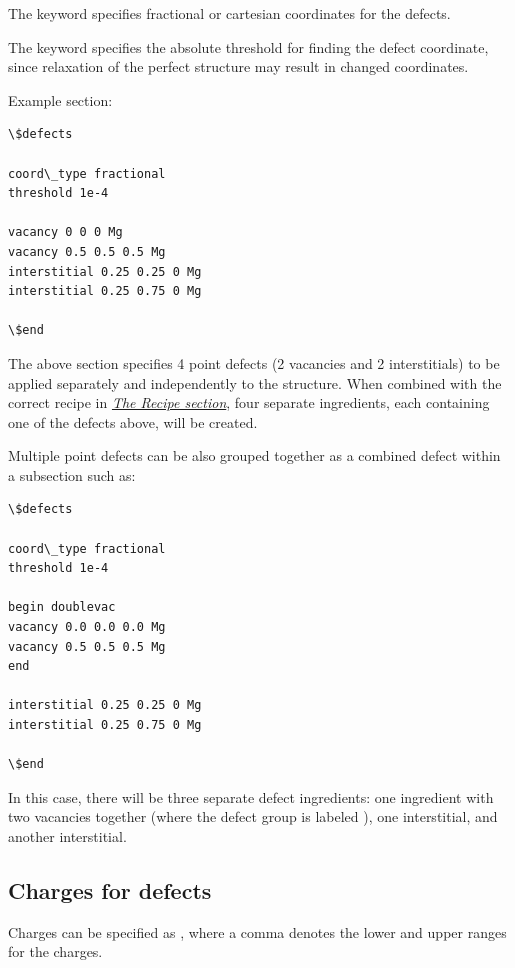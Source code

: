 \documentclass[letterpaper,10pt,english]{sphinxmanual}
\begin{document}
The  keyword specifies fractional or cartesian coordinates for the defects.

The  keyword specifies the absolute threshold for finding the defect coordinate, since relaxation of the perfect structure may result in changed coordinates.

Example  section:

\begin{Verbatim}[commandchars=\\\{\}]
\$defects

coord\_type fractional
threshold 1e-4

vacancy 0 0 0 Mg
vacancy 0.5 0.5 0.5 Mg
interstitial 0.25 0.25 0 Mg
interstitial 0.25 0.75 0 Mg

\$end
\end{Verbatim}

The above section specifies 4 point defects (2 vacancies and 2 interstitials) to be applied separately and independently to the structure. When combined with the correct recipe in {\hyperref[3_1_3_recipe::doc]{\emph{The Recipe section}}}, four separate ingredients, each containing one of the defects above, will be created.

Multiple point defects can be also grouped together as a combined defect within a  subsection such as:

\begin{Verbatim}[commandchars=\\\{\}]
\$defects

coord\_type fractional
threshold 1e-4

begin doublevac
vacancy 0.0 0.0 0.0 Mg
vacancy 0.5 0.5 0.5 Mg
end

interstitial 0.25 0.25 0 Mg
interstitial 0.25 0.75 0 Mg

\$end
\end{Verbatim}

In this case, there will be three separate defect ingredients: one ingredient with two vacancies together (where the defect group is labeled ), one interstitial, and another interstitial.


\subsection{Charges for defects}
\label{3_1_5_defects:charges-for-defects}
Charges can be specified as , where a comma denotes the lower and upper ranges for the charges.
\end{document}
